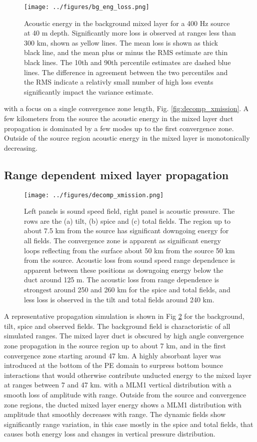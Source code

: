 \documentclass[preprint,NumberedRefs]{JASA}
\begin{document}
\begin{figure}
\texttt{[image: ../figures/bg\_eng\_loss.png]}
    \caption{Acoustic energy in the background mixed layer for a 400 Hz source at 40 m depth. Significantly more loss is observed at ranges less than 300 km, shown as yellow lines. The mean loss is shown as thick black line, and the mean plus or minus the RMS estimate are thin black lines. The 10th and 90th percentile estimates are dashed blue lines. The difference in agreement between the two percentiles and the RMS indicate a relativly small number of high loss events significantly impact the variance estimate.}
    \label{fig:bg_eng}
\end{figure}

with a focus on a single convergence zone length, Fig. \ref{fig:decomp_xmission}. A few kilometers from the source the acoustic energy in the mixed layer duct propagation is dominated by a few modes up to the first convergence zone. Outside of the source region acoustic energy in the mixed layer is monotonically decreasing.

\subsection{Range dependent mixed layer propagation}

\begin{figure}
\texttt{[image: ../figures/decomp\_xmission.png]}
    \caption{\label{fig:decomp_x}{Left panels is sound speed field, right panel is acoustic pressure. The rows are the (a) tilt, (b) spice and (c) total fields. The region up to about 7.5 km from the source has significant downgoing energy for all fields. The convergence zone is apparent as significant energy loops reflecting from the surface about 50 km from the source 50 km from the source. Acoustic loss from sound speed range dependence is apparent between these positions as downgoing energy below the duct around 125 m. The acoustic loss from range dependence is strongest around 250 and 260 km for the spice and total fields, and less loss is observed in the tilt and total fields around 240 km.}}
\end{figure}

A representative propagation simulation is shown in Fig \ref{fig:decomp_x} for the background, tilt, spice and observed fields. The background field is charactoristic of all simulated ranges. The mixed layer duct is obscured by high angle convergence zone propagation in the source region up to about 7 km, and in the first convergence zone starting around 47 km. A highly absorbant layer was introduced at the bottom of the PE domain to surpress bottom bounce interactions that would otherwise contribute unducted energy to the mixed layer at ranges between 7 and 47 km. with a MLM1 vertical distribution with a smooth loss of amplitude with range. Outside from the source and convergence zone regions, the ducted mixed layer energy shows a MLM1 distribution with amplitude that smoothly decreases with range. The dynamic fields show significantly range variation, in this case mostly in the spice and total fields, that causes both energy loss and changes in vertical pressure distribution.
\end{document}
